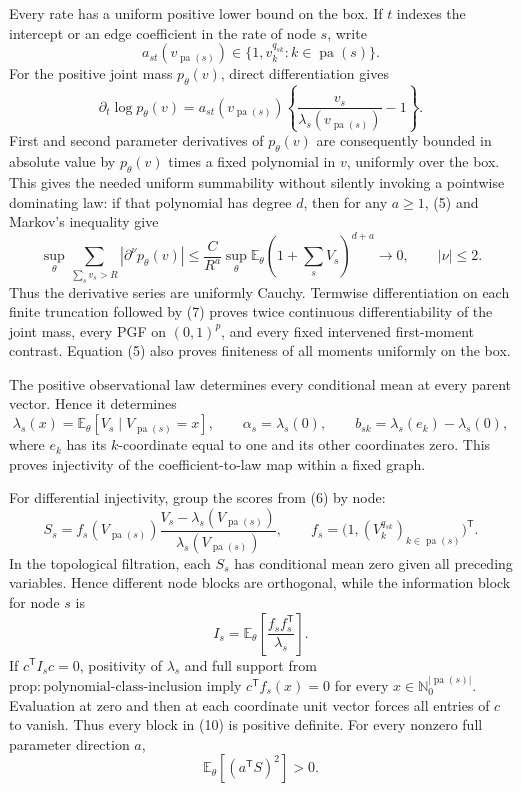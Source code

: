 Every rate has a uniform positive lower bound on the box.  If \(t\) indexes the intercept or an edge coefficient in the rate of node \(s\), write
\[
 a_{st}(v_{\operatorname{pa}(s)})
 \in\{1,v_k^{q_{sk}}:k\in\operatorname{pa}(s)\}.
\]
For the positive joint mass \(p_\theta(v)\), direct differentiation gives
\[
 \partial_t\log p_\theta(v)=
 a_{st}(v_{\operatorname{pa}(s)})
 \left\{\frac{v_s}{\lambda_s(v_{\operatorname{pa}(s)})}-1\right\}. \tag{6}
\]
First and second parameter derivatives of \(p_\theta(v)\) are consequently bounded in absolute value by \(p_\theta(v)\) times a fixed polynomial in \(v\), uniformly over the box.  This gives the needed uniform summability without silently invoking a pointwise dominating law: if that polynomial has degree \(d\), then for any \(a\geq1\), (5) and Markov's inequality give
\[
 \sup_\theta\sum_{\sum_s v_s>R}
 |\partial^\nu p_\theta(v)|
 \leq \frac{C}{R^a}
 \sup_\theta\mathbb E_\theta
 \left(1+\sum_sV_s\right)^{d+a}
 \longrightarrow0,
 \qquad |\nu|\leq2. \tag{7}
\]
Thus the derivative series are uniformly Cauchy.  Termwise differentiation on each finite truncation followed by (7) proves twice continuous differentiability of the joint mass, every PGF on \((0,1)^p\), and every fixed intervened first-moment contrast.  Equation (5) also proves finiteness of all moments uniformly on the box.

The positive observational law determines every conditional mean at every parent vector.  Hence it determines
\[
 \lambda_s(x)=\mathbb E_\theta[V_s\mid V_{\operatorname{pa}(s)}=x],
 \qquad
 \alpha_s=\lambda_s(0),
 \qquad
 b_{sk}=\lambda_s(e_k)-\lambda_s(0), \tag{8}
\]
where \(e_k\) has its \(k\)-coordinate equal to one and its other coordinates zero.  This proves injectivity of the coefficient-to-law map within a fixed graph.

For differential injectivity, group the scores from (6) by node:
\[
 S_s=f_s(V_{\operatorname{pa}(s)})
 \frac{V_s-\lambda_s(V_{\operatorname{pa}(s)})}
 {\lambda_s(V_{\operatorname{pa}(s)})},
 \qquad
 f_s=\bigl(1,(V_k^{q_{sk}})_{k\in\operatorname{pa}(s)}\bigr)^{\mathsf T}. \tag{9}
\]
In the topological filtration, each \(S_s\) has conditional mean zero given all preceding variables.  Hence different node blocks are orthogonal, while the information block for node \(s\) is
\[
 I_s=\mathbb E_\theta\!\left[\frac{f_sf_s^{\mathsf T}}{\lambda_s}\right]. \tag{10}
\]
If \(c^{\mathsf T}I_sc=0\), positivity of \(\lambda_s\) and full support from \(\mathrm{prop{:}polynomial\text{-}class\text{-}inclusion}\) imply \(c^{\mathsf T}f_s(x)=0\) for every \(x\in\mathbb N_0^{|\operatorname{pa}(s)|}\).  Evaluation at zero and then at each coordinate unit vector forces all entries of \(c\) to vanish.  Thus every block in (10) is positive definite.  For every nonzero full parameter direction \(a\),
\[
 \mathbb E_\theta[(a^{\mathsf T}S)^2]>0. \tag{11}
\]

